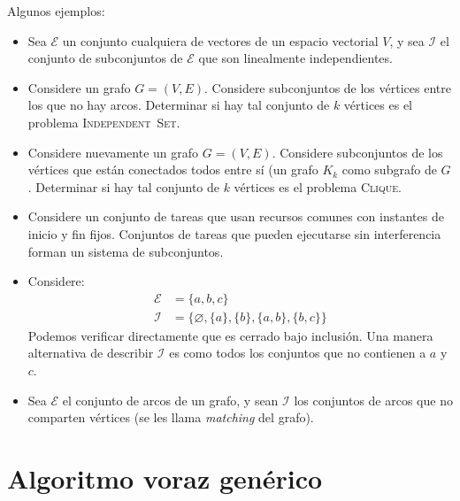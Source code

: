  Algunos ejemplos:
  \begin{itemize}
  \item
    Sea \(\mathscr{E}\) un conjunto cualquiera de vectores
    de un espacio vectorial \(V\),
    y sea \(\mathscr{I}\) el conjunto de subconjuntos de \(\mathscr{E}\)
    que son linealmente independientes.
  \item
    Considere un grafo \(G = (V, E)\).
    Considere subconjuntos de los vértices entre los que no hay arcos.
    Determinar si hay tal conjunto de \(k\) vértices
    es el problema \foreignlanguage{english}{\textsc{Independent~Set}}.
  \item
    Considere nuevamente un grafo \(G = (V, E)\).
    Considere subconjuntos de los vértices
    que están conectados todos entre sí
    (un grafo \(K_k\) como subgrafo de \(G\).
    Determinar si hay tal conjunto de \(k\) vértices
    es el problema \foreignlanguage{english}{\textsc{Clique}}.
  \item
    Considere un conjunto de tareas que usan recursos comunes
    con instantes de inicio y fin fijos.
    Conjuntos de tareas que pueden ejecutarse sin interferencia
    forman un sistema de subconjuntos.
  \item
    Considere:
    \begin{align*}
      \mathscr{E}
        &= \{ a, b, c \} \\
      \mathscr{I}
        &= \{ \varnothing, \{ a \}, \{ b \}, \{ a, b \}, \{ b, c \} \}
    \end{align*}
    Podemos verificar directamente que es cerrado bajo inclusión.
    Una manera alternativa de describir \(\mathscr{I}\)
    es como todos los conjuntos que no contienen a \(a\) y \(c\).
  \item
    Sea \(\mathscr{E}\) el conjunto de arcos de un grafo,
    y sean \(\mathscr{I}\) los conjuntos de arcos que no comparten vértices
    (se les llama \emph{\foreignlanguage{english}{matching}}
     del grafo).
  \end{itemize}

\section{Algoritmo voraz genérico}
\label{sec:greedy-generic}

